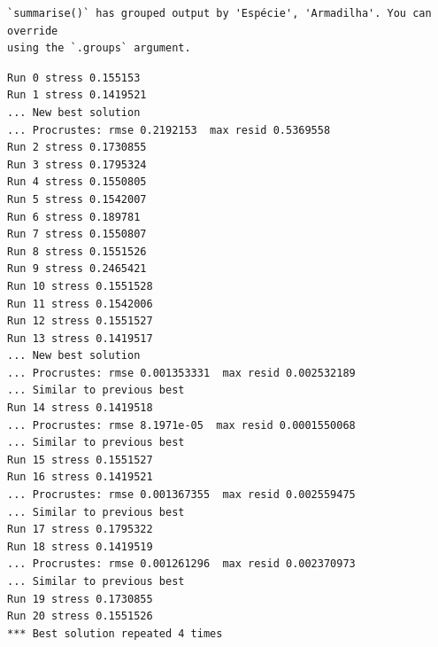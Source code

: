 \documentclass[
  letterpaper,
  DIV=11,
  numbers=noendperiod]{scrartcl}
\newenvironment{Shaded}{\begin{snugshade}}{\end{snugshade}}
\newcommand{\AttributeTok}[1]{\textcolor[rgb]{0.40,0.45,0.13}{#1}}
\newcommand{\ConstantTok}[1]{\textcolor[rgb]{0.56,0.35,0.01}{#1}}
\newcommand{\FunctionTok}[1]{\textcolor[rgb]{0.28,0.35,0.67}{#1}}
\newcommand{\NormalTok}[1]{\textcolor[rgb]{0.00,0.23,0.31}{#1}}
\newcommand{\OtherTok}[1]{\textcolor[rgb]{0.00,0.23,0.31}{#1}}
\newcommand{\SpecialCharTok}[1]{\textcolor[rgb]{0.37,0.37,0.37}{#1}}
\newcommand{\StringTok}[1]{\textcolor[rgb]{0.13,0.47,0.30}{#1}}
\begin{document}
\begin{verbatim}
`summarise()` has grouped output by 'Espécie', 'Armadilha'. You can override
using the `.groups` argument.
\end{verbatim}

\begin{Shaded}
\end{Shaded}

\begin{verbatim}
Run 0 stress 0.155153 
Run 1 stress 0.1419521 
... New best solution
... Procrustes: rmse 0.2192153  max resid 0.5369558 
Run 2 stress 0.1730855 
Run 3 stress 0.1795324 
Run 4 stress 0.1550805 
Run 5 stress 0.1542007 
Run 6 stress 0.189781 
Run 7 stress 0.1550807 
Run 8 stress 0.1551526 
Run 9 stress 0.2465421 
Run 10 stress 0.1551528 
Run 11 stress 0.1542006 
Run 12 stress 0.1551527 
Run 13 stress 0.1419517 
... New best solution
... Procrustes: rmse 0.001353331  max resid 0.002532189 
... Similar to previous best
Run 14 stress 0.1419518 
... Procrustes: rmse 8.1971e-05  max resid 0.0001550068 
... Similar to previous best
Run 15 stress 0.1551527 
Run 16 stress 0.1419521 
... Procrustes: rmse 0.001367355  max resid 0.002559475 
... Similar to previous best
Run 17 stress 0.1795322 
Run 18 stress 0.1419519 
... Procrustes: rmse 0.001261296  max resid 0.002370973 
... Similar to previous best
Run 19 stress 0.1730855 
Run 20 stress 0.1551526 
*** Best solution repeated 4 times
\end{verbatim}
\end{document}
